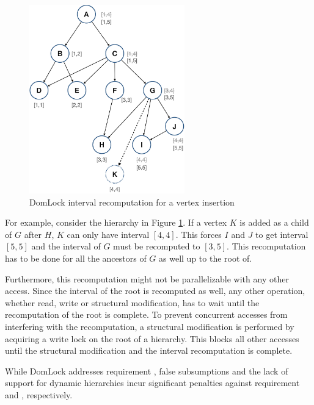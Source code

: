 \begin{figure}[h]
    \centering
    \captionsetup{justification=centering}
    \includegraphics[width=0.6\textwidth]{figures/domlock_example_with_SM.png}
    \caption{DomLock interval recomputation for a vertex insertion}
    \label{fig:domlock_example_SM}
\end{figure}

For example, consider the hierarchy in Figure \ref{fig:domlock_example_SM}. If a vertex $K$ is added as a child of $G$ after $H$, $K$ can only have interval $[4,4]$. This forces $I$ and $J$ to get interval $[5,5]$ and the interval of $G$ must be recomputed to $[3,5]$. This recomputation has to be done for all the ancestors of $G$ as well up to the root of. 

Furthermore, this recomputation might not be parallelizable with any other access. Since the interval of the root is recomputed as well, any other operation, whether read, write or structural modification, has to wait until the recomputation of the root is complete. 
To prevent concurrent accesses from interfering with the recomputation, a structural modification is performed by acquiring a write lock on the root of a hierarchy. This blocks all other accesses until the structural modification and the interval recomputation is complete. 


While DomLock addresses requirement \Rb, false subsumptions and the lack of support for dynamic hierarchies incur significant penalties against requirement \Rc and \Rd, respectively.



